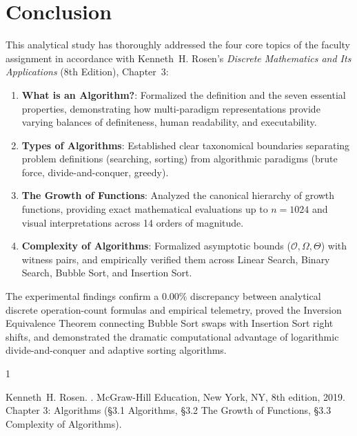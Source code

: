 \documentclass[11pt,a4paper,oneside]{report}
\theoremstyle{definition}
\begin{document}
\chapter{Conclusion}
\label{chap:conclusion}

This analytical study has thoroughly addressed the four core topics of the faculty assignment in accordance with Kenneth~H. Rosen's \emph{Discrete Mathematics and Its Applications} (8th Edition), Chapter~3:
\begin{enumerate}
    \item \textbf{What is an Algorithm?}: Formalized the definition and the seven essential properties, demonstrating how multi-paradigm representations provide varying balances of definiteness, human readability, and executability.
    \item \textbf{Types of Algorithms}: Established clear taxonomical boundaries separating problem definitions (searching, sorting) from algorithmic paradigms (brute force, divide-and-conquer, greedy).
    \item \textbf{The Growth of Functions}: Analyzed the canonical hierarchy of growth functions, providing exact mathematical evaluations up to $n = 1024$ and visual interpretations across 14 orders of magnitude.
    \item \textbf{Complexity of Algorithms}: Formalized asymptotic bounds ($\mathcal{O}, \Omega, \Theta$) with witness pairs, and empirically verified them across Linear Search, Binary Search, Bubble Sort, and Insertion Sort.
\end{enumerate}

The experimental findings confirm a 0.00\% discrepancy between analytical discrete operation-count formulas and empirical telemetry, proved the Inversion Equivalence Theorem connecting Bubble Sort swaps with Insertion Sort right shifts, and demonstrated the dramatic computational advantage of logarithmic divide-and-conquer and adaptive sorting algorithms.

\begin{thebibliography}{1}

Kenneth~H. Rosen.
.
\newblock McGraw-Hill Education, New York, NY, 8th edition, 2019.
\newblock Chapter 3: Algorithms (\S3.1 Algorithms, \S3.2 The Growth of Functions, \S3.3 Complexity of Algorithms).

\end{thebibliography}
\end{document}
